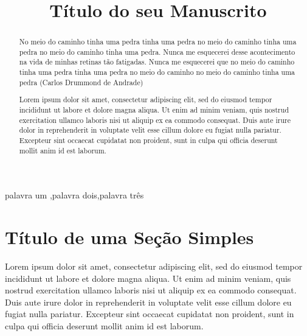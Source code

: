 \documentclass[preprint,12pt]{elsarticle}
\begin{document}
\begin{frontmatter}

\title{Título do seu Manuscrito}

\begin{abstract}
\begin{resumop}
No meio do caminho tinha uma pedra tinha uma pedra no meio do caminho tinha uma pedra no meio do caminho tinha uma pedra. Nunca me esquecerei desse acontecimento na vida de minhas retinas tão fatigadas. Nunca me esquecerei que no meio do caminho tinha uma pedra tinha uma pedra no meio do caminho no meio do caminho tinha uma pedra (Carlos Drummond de Andrade)
\end{resumop}

\begin{resumoi}
Lorem ipsum dolor sit amet, consectetur adipiscing elit, sed do eiusmod tempor incididunt ut labore et dolore magna aliqua. Ut enim ad minim veniam, quis nostrud exercitation ullamco laboris nisi ut aliquip ex ea commodo consequat. Duis aute irure dolor in reprehenderit in voluptate velit esse cillum dolore eu fugiat nulla pariatur. Excepteur sint occaecat cupidatat non proident, sunt in culpa qui officia deserunt mollit anim id est laborum.
\end{resumoi}
\end{abstract}

\begin{keyword}
palavra um \sep palavra dois\sep palavra três
\end{keyword}

\end{frontmatter}

\linenumbers

\section{Título de uma Seção Simples}
\label{sec:sample1}


Lorem ipsum dolor sit amet, consectetur adipiscing \citep{Fabioetal2013} elit, sed do eiusmod tempor incididunt ut labore et dolore magna \citet{Blondeletal2008} aliqua. Ut enim ad minim veniam, quis nostrud exercitation ullamco laboris nisi ut aliquip ex ea commodo consequat. Duis aute irure dolor in reprehenderit in voluptate velit esse cillum dolore eu fugiat nulla pariatur. Excepteur sint occaecat cupidatat non proident, sunt in culpa qui officia deserunt mollit \citet{Blondeletal2008,FabricioLiang2013} anim id est laborum.
\end{document}
